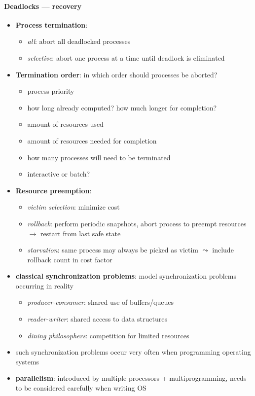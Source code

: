 \paragraph{Deadlocks --- recovery}
\begin{itemize}
  \item \textbf{Process termination}:
  \begin{itemize}
    \item \emph{all}: abort all deadlocked processes
    \item \emph{selective}: abort one process at a time until deadlock is eliminated
  \end{itemize}
  \item \textbf{Termination order}: in which order should processes be aborted?
  \begin{itemize}
    \item process priority
    \item how long already computed? how much longer for completion?
    \item amount of resources used
    \item amount of resources needed for completion
    \item how many processes will need to be terminated
    \item interactive or batch?
  \end{itemize}
  \item \textbf{Resource preemption}:
  \begin{itemize}
    \item \emph{victim selection}: minimize cost
    \item \emph{rollback}: perform periodic snapshots, abort process to preempt resources $ \to $ restart from last safe state
    \item \emph{starvation}: same process may always be picked as victim $ \leadsto $ include rollback count in cost factor
  \end{itemize}
\end{itemize}

\begin{summary}
  \begin{itemize}
    \item \textbf{classical synchronization problems}: model synchronization problems occurring in reality
    \begin{itemize}
      \item \emph{producer-consumer}: shared use of buffers/queues
      \item \emph{reader-writer}: shared access to data structures
      \item \emph{dining philosophers}: competition for limited resources
    \end{itemize}
    \item such synchronization problems occur very often when programming operating systems
    \item \textbf{parallelism}: introduced by multiple processors + multiprogramming, needs to be considered carefully when writing OS
  \end{itemize}
\end{summary}